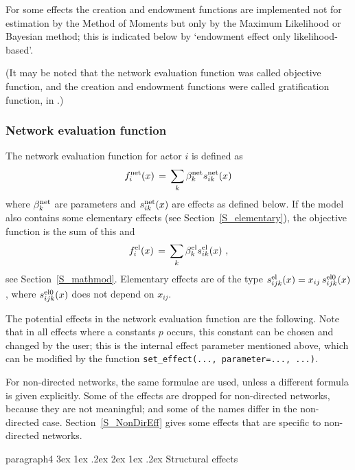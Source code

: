 \documentclass[a4paper,fleqn,11pt]{article}
\makeatletter
\renewcommand\paragraph{\@startsection
   {paragraph}{4}{\z@}               %
   {3ex \@plus1ex \@minus.2ex}       %
   {2ex \@plus1ex \@minus.2ex}       %
   {\normalfont\normalsize\bfseries\itshape}}   %
\newcommand{\+}{\, + \,}
\makeatother
\begin{document}
For some effects
the creation and endowment functions are
implemented not for estimation by the Method of Moments
but only by the Maximum Likelihood or Bayesian method;
this is indicated below by `endowment effect only likelihood-based'.

(It may be noted that the network evaluation function
was called objective function,
and the creation and endowment functions were called gratification function,
in \citet{Snijders01}.)

\subsubsection{Network evaluation function}
\label{S_f}

The network evaluation function for actor $i$ is defined as
\begin{equation}
f^{\rm net}_i(x) \, = \,
              \sum_k \beta^{\rm net}_k s^{\rm net}_{ik}(x)   \label{f_net}
\end{equation}
where $\beta^{\rm net}_k$ are parameters and $s^{\rm net}_{ik}(x)$
are effects as defined below.
If the model also contains some elementary effects
(see Section~\ref{S_elementary}), the objective
function is the sum of this and
\begin{equation}
f^{\rm el}_i(x) \, = \,
              \sum_k \beta^{\rm el}_k s^{\rm el}_{ik}(x)  \ , \label{f_el_net}
\end{equation}
see Section~\ref{S_mathmod}.
Elementary effects are of the type $s^{\rm el}_{ijk}(x) = x_{ij}\,s^{\rm el0}_{ijk}(x)$,
where $s^{\rm el0}_{ijk}(x)$ does not depend on $x_{ij}$.


The potential effects in the \hypertarget{T_objective}{network
evaluation function}
are the following. Note that in all
effects where a constants $p$ occurs, this constant can be chosen
and changed by the user;
this is the internal effect parameter mentioned above,
which can be modified by the function \texttt{set\_effect(..., parameter=..., ...)}.

For non-directed networks, the same formulae are used,
unless a different formula is given explicitly.
Some of the effects are dropped for non-directed networks, because
they are not meaningful; and some of the names differ in the
non-directed case.
Section~\ref{S_NonDirEff} gives some effects that are specific
to non-directed networks.

\paragraph{Structural effects}
\end{document}
